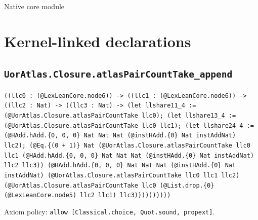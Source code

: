 \documentclass[11pt]{article}
\begin{document}
\begin{center}{\LARGE Native core module}\end{center}
\section*{Kernel-linked declarations}
\subsection*{\texttt{UorAtlas.Closure.atlasPairCountTake\_append}}
\noindent\texttt{((llc0 : (@LexLeanCore.node6)) -> ((llc1 : (@LexLeanCore.node6)) -> ((llc2 : Nat) -> ((llc3 : Nat) -> (let llshare11\_4 := (@UorAtlas.Closure.atlasPairCountTake llc0); (let llshare13\_4 := (@UorAtlas.Closure.atlasPairCountTake llc0 llc1); (let llshare24\_4 := (@HAdd.hAdd.\{0, 0, 0\} Nat Nat Nat (@instHAdd.\{0\} Nat instAddNat) llc2); (@Eq.\{(0 + 1)\} Nat (@UorAtlas.Closure.atlasPairCountTake llc0 llc1 (@HAdd.hAdd.\{0, 0, 0\} Nat Nat Nat (@instHAdd.\{0\} Nat instAddNat) llc2 llc3)) (@HAdd.hAdd.\{0, 0, 0\} Nat Nat Nat (@instHAdd.\{0\} Nat instAddNat) (@UorAtlas.Closure.atlasPairCountTake llc0 llc1 llc2) (@UorAtlas.Closure.atlasPairCountTake llc0 (@List.drop.\{0\} (@LexLeanCore.node5) llc2 llc1) llc3))))))))))}\par
\noindent Axiom policy: \texttt{allow [Classical.choice, Quot.sound, propext]}.\par
\end{document}
